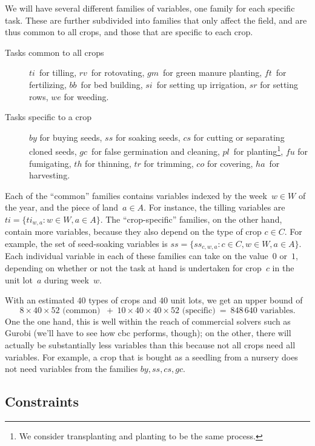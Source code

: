 \documentclass[11pt]{amsart}
\numberwithin{equation}{section}
\begin{document}
We will have several different families of variables, one family for
each specific task. These are further subdivided into families that
only affect the field, and are thus common to all crops, and those
that are specific to each crop.

\begin{description}
\item[Tasks common to all crops]  $ti$~for tilling, $rv$~for
  rotovating, $gm$~for green manure planting, $ft$~for fertilizing,
  $bb$~for bed building, $si$~for setting up irrigation, $sr$ for
  setting rows, $we$ for weeding.

\smallskip
\item[Tasks specific to a crop] $by$ for buying seeds, $ss$ for
  soaking seeds, $cs$ for cutting or separating cloned seeds, $gc$~for
  false germination and cleaning, $pl$~for planting\footnote{We
    consider transplanting and planting to be the same process.},
  $f\!u$ for fumigating, $th$ for thinning, $tr$ for trimming, $co$
  for covering, $ha$~for harvesting.
\end{description}

Each of the ``common'' families contains variables indexed by the
week~$w\in W$ of the year, and the piece of land~$a\in A$. For
instance, the tilling variables are $ti=\{ti_{w,a}:w\in W, a\in
A\}$. The ``crop-specific'' families, on the other hand, contain more
variables, because they also depend on the type of crop $c\in C$. For
example, the set of seed-soaking variables is $ss=\{ss_{c,w,a} : c\in
C, w\in W, a\in A\}$. Each individual variable in each of these
families can take on the value~$0$ or~$1$, depending on whether or not
the task at hand is undertaken for crop~$c$ in the unit lot~$a$
during week~$w$.

With an estimated $40$ types of crops and $40$ unit lots, we get an
upper bound of
\[
   8\times 40\times 52 \text{ (common) }
   \ + \ 
   10\times 40\times 40\times 52 \text{ (specific)}
   \ = \ 
   848\,640 \text{ variables.}
\]
One the one hand, this is well within the reach of commercial solvers
such as Gurobi (we'll have to see how cbc performs, though); on the
other, there will actually be substantially less variables than this
because not all crops need all variables. For example, a crop that is
bought as a seedling from a nursery does not need variables from the
families $by, ss, cs, gc$.

\subsection{Constraints}
\end{document}
